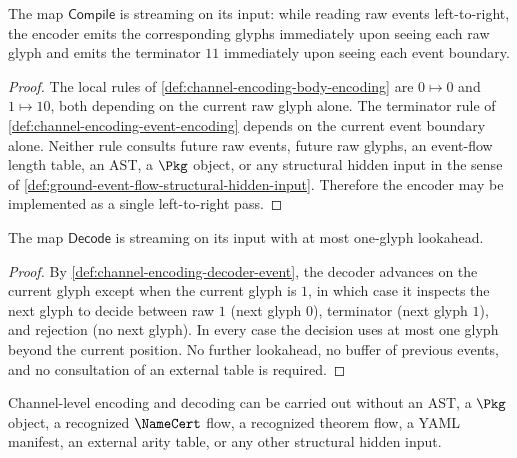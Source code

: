 \begin{proposition}
\label{prop:channel-encoding-encoder-streaming}
The map $\mathsf{Compile}$ is streaming on its input: while reading raw events left-to-right, the encoder emits the corresponding glyphs immediately upon seeing each raw glyph and emits the terminator $11$ immediately upon seeing each event boundary.
\end{proposition}

\begin{proof}
The local rules of \autoref{def:channel-encoding-body-encoding} are $0 \mapsto 0$ and $1 \mapsto 10$, both depending on the current raw glyph alone. The terminator rule of \autoref{def:channel-encoding-event-encoding} depends on the current event boundary alone. Neither rule consults future raw events, future raw glyphs, an event-flow length table, an AST, a $\Pkg$ object, or any structural hidden input in the sense of \autoref{def:ground-event-flow-structural-hidden-input}. Therefore the encoder may be implemented as a single left-to-right pass.
\end{proof}

\begin{proposition}
\label{prop:channel-encoding-decoder-streaming}
The map $\mathsf{Decode}$ is streaming on its input with at most one-glyph lookahead.
\end{proposition}

\begin{proof}
By \autoref{def:channel-encoding-decoder-event}, the decoder advances on the current glyph except when the current glyph is $1$, in which case it inspects the next glyph to decide between raw $1$ (next glyph $0$), terminator (next glyph $1$), and rejection (no next glyph). In every case the decision uses at most one glyph beyond the current position. No further lookahead, no buffer of previous events, and no consultation of an external table is required.
\end{proof}

\begin{corollary}
\label{cor:channel-encoding-no-tree-no-manifest}
Channel-level encoding and decoding can be carried out without an AST, a $\Pkg$ object, a recognized $\NameCert$ flow, a recognized theorem flow, a YAML manifest, an external arity table, or any other structural hidden input.
\end{corollary}

